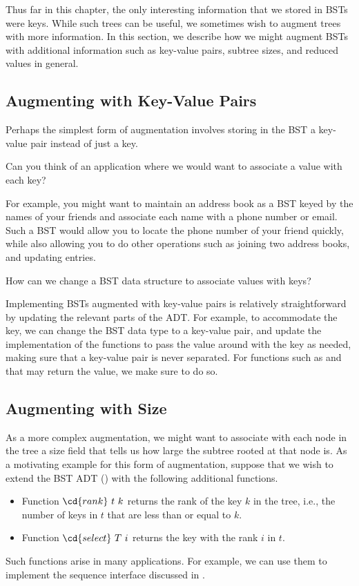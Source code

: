 Thus far in this chapter, the only interesting information that we
stored in BSTs were keys. While such trees can be useful, we
sometimes wish to augment trees with more information. 
%
In this section, we describe how we might augment BSTs with
additional information such as key-value pairs, subtree sizes, and
reduced values in general.


\subsection{Augmenting with Key-Value Pairs}
Perhaps the simplest form of augmentation involves storing in the BST
a key-value pair instead of just a key.
%
\begin{notesonly}
\begin{question}
Can you think of an application where we would want to associate a
value with each key?
\end{question}
For example, you might want to maintain an address book as a BST keyed
by the names of your friends and associate each name with a phone
number or email.  Such a BST would allow you to locate the phone
number of your friend quickly, while also allowing you to do other
operations such as joining two address books, and updating entries.
\end{notesonly}
%
\begin{question}
How can we change a BST data structure to associate values with keys?
\end{question}
%
Implementing BSTs augmented with key-value pairs is relatively
straightforward by updating the relevant parts of the ADT.
%
For example, to accommodate the key, we can change the BST data type
to a key-value pair, and update the implementation of the functions to
pass the value around with the key as needed, making sure that a
key-value pair is never separated.  For functions such as 
and  that may return the value, we make sure to do so.

\subsection{Augmenting with Size}
As a more complex augmentation, we might want to associate with each
node in the tree a size field that tells us how large the subtree
rooted at that node is.
%
As a motivating example for this form of augmentation, suppose that we
wish to extend the BST ADT () with the following
additional functions.
%
\begin{itemize}
\item Function $\cd{rank}~t~k$ returns the rank of the key $k$ in
  the tree, i.e., the number of keys in $t$ that are less than or
  equal to $k$.

\item Function $\cd{select}~T~i$ returns the key with the rank $i$ in $t$.

\end{itemize}
%
Such functions arise in many applications.  For example, we can use
them to implement the sequence interface discussed in . 

